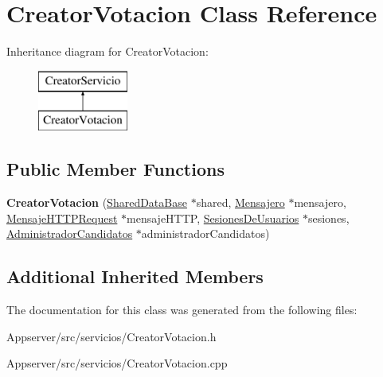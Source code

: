 \hypertarget{classCreatorVotacion}{}\section{Creator\+Votacion Class Reference}
\label{classCreatorVotacion}
Inheritance diagram for Creator\+Votacion\+:\begin{figure}[H]
\begin{center}
\leavevmode
\includegraphics[height=2.000000cm]{classCreatorVotacion}
\end{center}
\end{figure}
\subsection*{Public Member Functions}
\begin{DoxyCompactItemize}
\item 
{\bfseries Creator\+Votacion} (\hyperlink{classSharedDataBase}{Shared\+Data\+Base} $\ast$shared, \hyperlink{classMensajero}{Mensajero} $\ast$mensajero, \hyperlink{classMensajeHTTPRequest}{Mensaje\+H\+T\+T\+P\+Request} $\ast$mensaje\+H\+T\+TP, \hyperlink{classSesionesDeUsuarios}{Sesiones\+De\+Usuarios} $\ast$sesiones, \hyperlink{classAdministradorCandidatos}{Administrador\+Candidatos} $\ast$administrador\+Candidatos)\hypertarget{classCreatorVotacion_a451c2e776b90aca07dc6c0aecb75ee0a}{}\label{classCreatorVotacion_a451c2e776b90aca07dc6c0aecb75ee0a}

\end{DoxyCompactItemize}
\subsection*{Additional Inherited Members}


The documentation for this class was generated from the following files\+:\begin{DoxyCompactItemize}
\item 
Appserver/src/servicios/Creator\+Votacion.\+h\item 
Appserver/src/servicios/Creator\+Votacion.\+cpp\end{DoxyCompactItemize}
